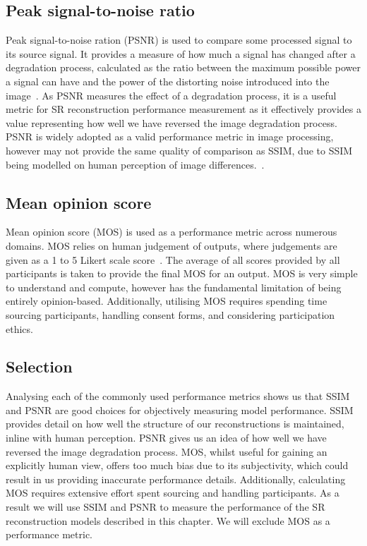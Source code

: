 \subsection{Peak signal-to-noise ratio}
Peak signal-to-noise ration (PSNR) is used to compare some processed signal to its source signal. It provides a measure of how much a signal has changed after a degradation process, calculated as the ratio between the maximum possible power a signal can have and the power of the distorting noise introduced into the image~\cite{psnr}. As PSNR measures the effect of a degradation process, it is a useful metric for SR reconstruction performance measurement as it effectively provides a value representing how well we have reversed the image degradation process. PSNR is widely adopted as a valid performance metric in image processing, however may not provide the same quality of comparison as SSIM, due to SSIM being modelled on human perception of image differences.~\cite{psnrAnalysis}.

\subsection{Mean opinion score}
Mean opinion score (MOS) is used as a performance metric across numerous domains. MOS relies on human judgement of outputs, where judgements are given as a 1 to 5 Likert scale score~\cite{srgan}. The average of all scores provided by all participants is taken to provide the final MOS for an output. MOS is very simple to understand and compute, however has the fundamental limitation of being entirely opinion-based. Additionally, utilising MOS requires spending time sourcing participants, handling consent forms, and considering participation ethics.

\subsection{Selection}
Analysing each of the commonly used performance metrics shows us that SSIM and PSNR are good choices for objectively measuring model performance. SSIM provides detail on how well the structure of our reconstructions is maintained, inline with human perception. PSNR gives us an idea of how well we have reversed the image degradation process. MOS, whilst useful for gaining an explicitly human view, offers too much bias due to its subjectivity, which could result in us providing inaccurate performance details. Additionally, calculating MOS requires extensive effort spent sourcing and handling participants. As a result we will use SSIM and PSNR to measure the performance of the SR reconstruction models described in this chapter. We will exclude MOS as a performance metric.